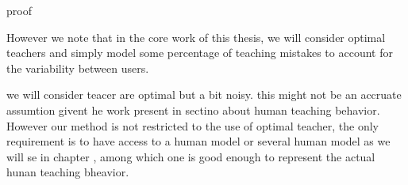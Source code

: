 proof

However we note that in the core work of this thesis, we will consider optimal teachers and simply model some percentage of teaching mistakes to account for the variability between users.


we will consider teacer are optimal but a bit noisy. this might not be an accruate assumtion givent he work present in sectino about human teaching behavior. However our method is not restricted to the use of optimal teacher, the only requirement is to have access to a human model or several human model as we will se in chapter , among which one is good enough to represent the actual hunan teaching bheavior.

